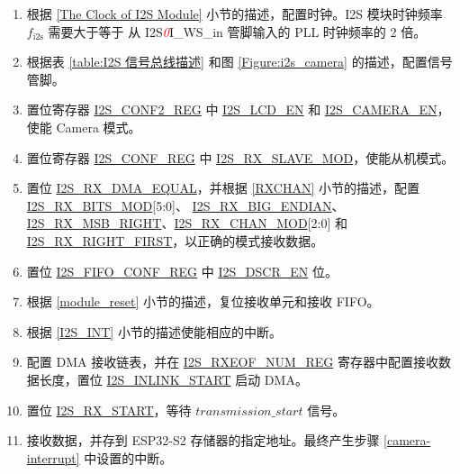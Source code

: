 \documentclass[main\_\_CN.tex]{subfiles}
\begin{document}
\begin{enumerate}
    \item 根据 \ref{The Clock of I2S Module} 小节的描述，配置时钟。I2S 模块时钟频率 $f_{\textrm{i2s}}$ 需要大于等于 从 I2S\textcolor{red}{\it{0}}I\_WS\_in 管脚输入的 PLL 时钟频率的 2 倍。

    \item 根据表 \ref{table:I2S 信号总线描述} 和图 \ref{Figure:i2s_camera} 的描述，配置信号管脚。

     \item 置位寄存器 \hyperref[regdesc:I2SCONF2REG]{I2S\_CONF2\_REG} 中 \hyperref[fielddesc:I2SLCDEN]{I2S\_LCD\_EN} 和 \hyperref[fielddesc:I2SCAMERAEN]{I2S\_CAMERA\_EN}，使能 Camera 模式。
     \item 置位寄存器 \hyperref[regdesc:I2SCONFREG]{I2S\_CONF\_REG} 中 \hyperref[fielddesc:I2SRXSLAVEMOD]{I2S\_RX\_SLAVE\_MOD}，使能从机模式。


    \item 置位 \hyperref[fielddesc:I2SRXDMAEQUAL]{I2S\_RX\_DMA\_EQUAL}，并根据 \ref{RXCHAN} 小节的描述，配置 \hyperref[fielddesc:I2SRXBITSMOD]{I2S\_RX\_BITS\_MOD}[5:0]、 \hyperref[fielddesc:I2SRXBIGENDIAN]{I2S\_RX\_BIG\_ENDIAN}、\hyperref[fielddesc:I2SRXMSBRIGHT]{I2S\_RX\_MSB\_RIGHT}、\hyperref[fielddesc:I2SRXCHANMOD]{I2S\_RX\_CHAN\_MOD}[2:0] 和 \hyperref[fielddesc:I2SRXRIGHTFIRST]{I2S\_RX\_RIGHT\_FIRST}，以正确的模式接收数据。

    \item 置位 \hyperref[regdesc:I2SFIFOCONFREG]{I2S\_FIFO\_CONF\_REG} 中 \hyperref[fielddesc:I2SDSCREN]{I2S\_DSCR\_EN} 位。
    \item 根据 \ref{module_reset} 小节的描述，复位接收单元和接收 FIFO。
    \item 根据 \ref{I2S_INT} 小节的描述使能相应的中断。\label{camera-interrupt}

    \item 配置 DMA 接收链表，并在 \hyperref[regdesc:I2SRXEOFNUMREG]{I2S\_RXEOF\_NUM\_REG} 寄存器中配置接收数据长度，置位 \hyperref[fielddesc:I2SINLINKSTART]{I2S\_INLINK\_START} 启动 DMA。

    \item 置位 \hyperref[fielddesc:I2SRXSTART]{I2S\_RX\_START}，等待 \hyperref[start-signal]{\begin{math}{transmission\_start} \end{math}} 信号。

    \item 接收数据，并存到 ESP32-S2 存储器的指定地址。最终产生步骤 \ref{camera-interrupt} 中设置的中断。
\end{enumerate}
\end{document}

